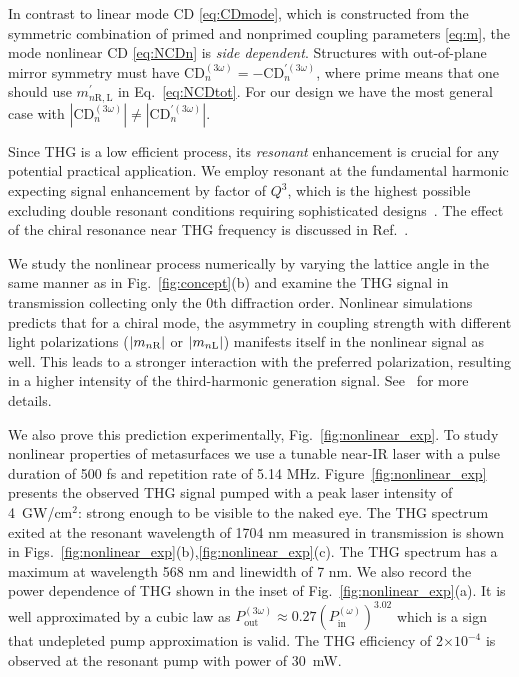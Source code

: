 \documentclass[
    reprint,
    superscriptaddress,
    a4paper,
    amsmath,amssymb,
    prb,
]{revtex4-2}
\begin{document}
In contrast to linear mode CD \eqref{eq:CDmode}, which is constructed from the symmetric combination of primed and nonprimed coupling parameters \eqref{eq:m}, the mode nonlinear CD \eqref{eq:NCDn} is \textit{side dependent}.
Structures with out-of-plane mirror symmetry must have $\mathrm{CD}_n^{(3\omega)} = - \mathrm{CD}_n^{\prime (3\omega)}$, where prime means that one should use $m^{\prime}_{n\text{R},\text{L}}$ in Eq.~\eqref{eq:NCDtot}. For our design we have the most general case with $|\mathrm{CD}_n^{(3\omega)}| \neq |\mathrm{CD}_n^{\prime (3\omega)}|$. 







Since THG is a low efficient process, its \textit{resonant} enhancement is crucial for any potential practical application.
We employ resonant at the fundamental harmonic expecting signal enhancement by factor of $Q^3$, which is the highest possible excluding double resonant conditions requiring sophisticated designs~\cite{Koshelev2020Science}. The effect of the chiral resonance near THG frequency is discussed in Ref.~\cite{Antonov2023ieee_proceeding}.

We study the nonlinear process numerically by varying the lattice angle in the same manner as in Fig.~\ref{fig:concept}{(b)} and examine the THG signal in transmission collecting only the $0$th diffraction order. 
Nonlinear simulations predicts that for a chiral mode, the asymmetry in coupling strength  with different light polarizations ($\abs{m_{n\text{R}}}$ or $\abs{m_{n\text{L}}}$) manifests itself in the nonlinear signal as well. 
This leads to a stronger interaction with the preferred polarization, resulting in a higher intensity of the third-harmonic generation signal. See~\cite{SM} for more details.


We also prove this prediction experimentally, Fig.~\ref{fig:nonlinear_exp}. To study nonlinear properties of metasurfaces we use a tunable near-IR laser with a pulse duration of 500 fs and repetition rate of 5.14 MHz. Figure~\ref{fig:nonlinear_exp} presents the observed THG signal pumped with a peak laser intensity of 4~GW/cm$^2$: strong enough to be visible to the naked eye. The THG spectrum exited at the resonant wavelength of 1704 nm measured in transmission is shown in Figs.~\ref{fig:nonlinear_exp}(b),\ref{fig:nonlinear_exp}(c). 
The THG spectrum has a maximum at wavelength 568 nm and linewidth of 7 nm. 
We also record the power dependence of THG shown in the inset of Fig.~\ref{fig:nonlinear_exp}(a). It is well approximated by a cubic law as $P_{\text{out}}^{(3\omega)} \approx 0.27 (P_{\text{in}}^{(\omega)} )^{3.02}$ which is a sign that undepleted pump approximation is valid. The THG efficiency of 2$\times 10^{-4}$ is observed at the resonant pump with power of $30$~mW. 
\end{document}
